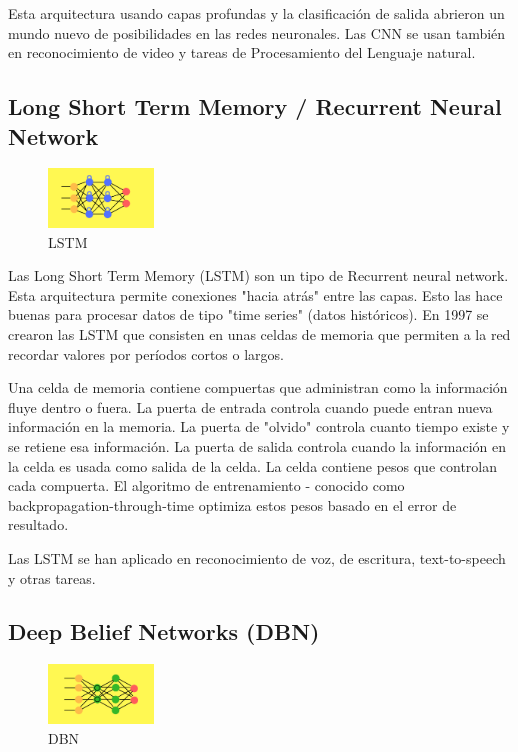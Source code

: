 \documentclass[a4paper]{article}
\begin{document}
Esta arquitectura usando capas profundas y la clasificación de 
salida abrieron un mundo nuevo de posibilidades en las redes 
neuronales. Las CNN se usan también en reconocimiento de video y 
tareas de Procesamiento del Lenguaje natural. 


\subsection{Long Short Term Memory / Recurrent Neural Network}
\begin{figure} %
    \centering
    \includegraphics[width=0.25\textwidth]{./images/net_lstm.png}
    \caption{LSTM}
\end{figure}

Las Long Short Term Memory (LSTM) son un tipo de Recurrent neural 
network. Esta arquitectura permite conexiones "hacia atrás" entre 
las capas. Esto las hace buenas para procesar datos de tipo "time 
series" (datos históricos). En 1997 se crearon las LSTM que 
consisten en unas celdas de memoria que permiten a la red recordar 
valores por períodos cortos o largos.

Una celda de memoria contiene compuertas que administran como la 
información fluye dentro o fuera. La puerta de entrada controla 
cuando puede entran nueva información en la memoria. La puerta de 
"olvido" controla cuanto tiempo existe y se retiene esa 
información. La puerta de salida controla cuando la información en 
la celda es usada como salida de la celda. La celda contiene pesos 
que controlan cada compuerta. El algoritmo de entrenamiento -
conocido como backpropagation-through-time optimiza estos pesos 
basado en el error de resultado.

Las LSTM se han aplicado en reconocimiento de voz, de escritura, 
text-to-speech y otras tareas.


\subsection{Deep Belief Networks (DBN)}
\begin{figure} %
    \centering
    \includegraphics[width=0.25\textwidth]{./images/deep_belief.png}
    \caption{DBN}
\end{figure}
\end{document}
